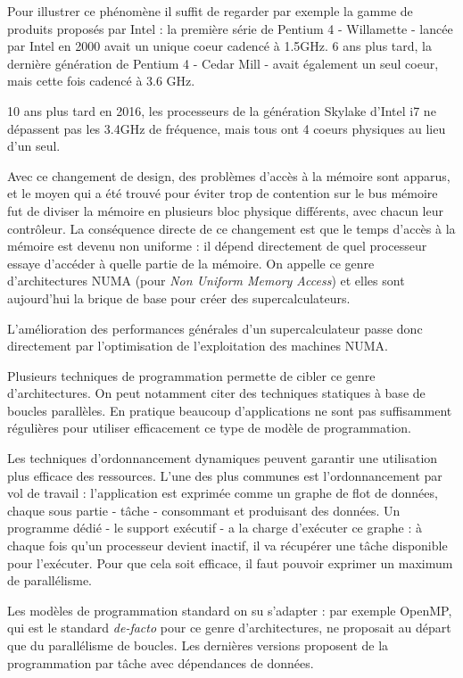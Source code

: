 Pour illustrer ce phénomène il suffit de regarder par exemple la gamme de produits proposés par Intel : la première série de Pentium 4 - Willamette - lancée par Intel en 2000 avait un unique coeur cadencé à 1.5GHz. 6 ans plus tard, la dernière génération de Pentium 4 - Cedar Mill - avait également un seul coeur, mais cette fois cadencé à 3.6 GHz.

10 ans plus tard en 2016, les processeurs de la génération Skylake d'Intel i7 ne dépassent pas les 3.4GHz de fréquence, mais tous ont 4 coeurs physiques au lieu d'un seul.

Avec ce changement de design, des problèmes d'accès à la mémoire sont apparus, et le moyen qui a été trouvé pour éviter trop de contention sur le bus mémoire fut de diviser la mémoire en plusieurs bloc physique différents, avec chacun leur contrôleur.
La conséquence directe de ce changement est que le temps d'accès à la mémoire est devenu non uniforme : il dépend directement de quel processeur essaye d'accéder à quelle partie de la mémoire.
On appelle ce genre d'architectures NUMA (pour \emph{Non Uniform Memory Access}) et elles sont aujourd'hui la brique de base pour créer des supercalculateurs.

L'amélioration des performances générales d'un supercalculateur passe donc directement par l'optimisation de l'exploitation des machines NUMA.

Plusieurs techniques de programmation permette de cibler ce genre d'architectures.
On peut notamment citer des techniques statiques à base de boucles parallèles.
En pratique beaucoup d'applications ne sont pas suffisamment régulières pour utiliser efficacement ce type de modèle de programmation.

Les techniques d'ordonnancement dynamiques peuvent garantir une utilisation plus efficace des ressources.
L'une des plus communes est l'ordonnancement par vol de travail : l'application est exprimée comme un graphe de flot de données, chaque sous partie - tâche - consommant et produisant des données.
Un programme dédié - le support exécutif - a la charge d'exécuter ce graphe : à chaque fois qu'un processeur devient inactif, il va récupérer une tâche disponible pour l'exécuter.
Pour que cela soit efficace, il faut pouvoir exprimer un maximum de parallélisme.

Les modèles de programmation standard on su s'adapter : par exemple OpenMP, qui est le standard \emph{de-facto} pour ce genre d'architectures, ne proposait au départ que du parallélisme de boucles. Les dernières versions proposent de la programmation par tâche avec dépendances de données.


